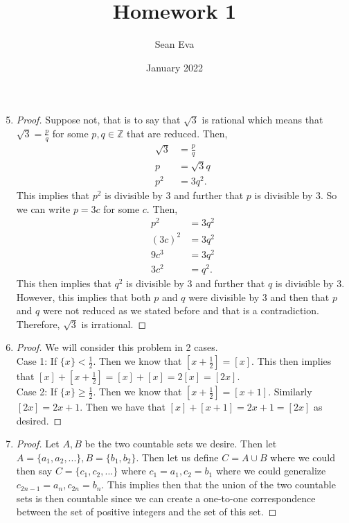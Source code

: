 \documentclass{article}
\title{Homework 1}
\author{Sean Eva}
\date{January 2022}
\begin{document}
\maketitle

\begin{enumerate}
    \setcounter{enumi}{4}
    \item 
    
    \begin{proof}
    Suppose not, that is to say that $\sqrt{3}$ is rational which means that $\sqrt{3}=\frac{p}{q}$ for some $p,q\in \mathbb{Z}$ that are reduced. Then,
    \begin{align*}
        \sqrt{3} &= \frac{p}{q}\\
        p &= \sqrt{3}q\\
        p^2 &= 3q^2.
    \end{align*} This implies that $p^2$ is divisible by $3$ and further that $p$ is divisible by $3$. So we can write $p=3c$ for some $c$. Then,
    \begin{align*}
        p^2 &= 3q^2\\
        (3c)^2 &= 3q^2\\
        9c^3 &= 3q^2\\
        3c^2 &= q^2.
    \end{align*} This then implies that $q^2$ is divisible by $3$ and further that $q$ is divisible by 3. However, this implies that both $p$ and $q$ were divisible by $3$ and then that $p$ and $q$ were not reduced as we stated before and that is a contradiction. Therefore, $\sqrt{3}$ is irrational.
    \end{proof}
    
    \setcounter{enumi}{11}
    \item
    
    \begin{proof}
    We will consider this problem in 2 cases.\\
    Case 1: If $\{x\}< \frac{1}{2}$. Then we know that $[x+\frac{1}{2}] = [x].$ This then implies that $[x]+[x+\frac{1}{2}] = [x]+[x] = 2[x] = [2x].$\\
    Case 2: If $\{x\}\geq \frac{1}{2}$. Then we know that $[x+\frac{1}{2}] = [x+1].$ Similarly $[2x]= 2x+1.$ Then we have that $[x]+[x+1] = 2x+1 = [2x]$ as desired.
    \end{proof}
    
    \setcounter{enumi}{27}
    \item
    
    \begin{proof}
    Let $A, B$ be the two countable sets we desire. Then let $A = \{a_1, a_2,...\}, B=\{b_1,b_2\}$. Then let us define $C=A \cup B$ where we could then say $C=\{c_1,c_2,...\}$ where $c_1=a_1,c_2=b_1$ where we could generalize $c_{2n-1} = a_n, c_{2n} = b_n$. This implies then that the union of the two countable sets is then countable since we can create a one-to-one correspondence between the set of positive integers and the set of this set.
    \end{proof}
    

\end{enumerate}
\end{document}
